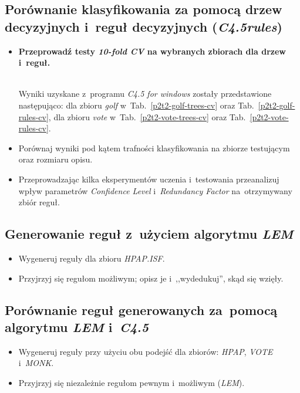 \subsection{Porównanie klasyfikowania za pomocą drzew decyzyjnych i~reguł decyzyjnych (\emph{C4.5rules})}
\begin{itemize}
\item \textbf{Przeprowadź testy \emph{10-fold CV} na wybranych zbiorach dla drzew i~reguł.}





	\\Wyniki uzyskane z~programu \emph{C4.5 for windows} zostały przedstawione następująco: dla zbioru \emph{golf} w~Tab.~\ref{p2t2-golf-trees-cv} oraz Tab.~\ref{p2t2-golf-rules-cv}, dla zbioru \emph{vote} w~Tab.~\ref{p2t2-vote-trees-cv} oraz Tab.~\ref{p2t2-vote-rules-cv}.

\item Porównaj wyniki pod kątem trafności klasyfikowania na zbiorze testującym oraz rozmiaru opisu.
	

	
\item Przeprowadzając kilka eksperymentów uczenia i~testowania przeanalizuj wpływ parametrów \emph{Confidence Level} i~\emph{Redundancy Factor} na~otrzymywany zbiór reguł.
\end{itemize}

\subsection{Generowanie reguł z~użyciem algorytmu \emph{LEM}}

\begin{itemize}
\item Wygeneruj reguły dla zbioru \emph{HPAP.ISF}.
\item Przyjrzyj się regułom możliwym; opisz je i~,,wydedukuj'', skąd się wzięły.
\end{itemize}

\subsection{Porównanie reguł generowanych za~pomocą algorytmu \emph{LEM} i~\emph{C4.5}}

\begin{itemize}
\item Wygeneruj reguły przy użyciu obu podejść dla zbiorów: \emph{HPAP}, \emph{VOTE} i~\emph{MONK}.
\item Przyjrzyj się niezależnie regułom pewnym i~możliwym (\emph{LEM}).
\end{itemize}

